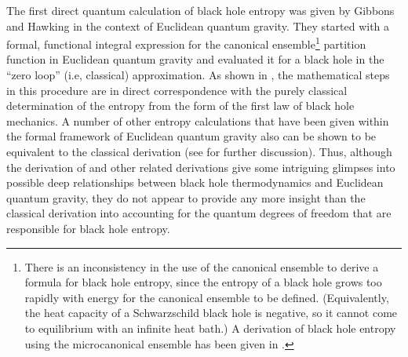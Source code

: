 \documentclass[12pt]{article}
\begin{document}
The first direct quantum calculation of black hole entropy was given
by Gibbons and Hawking \cite{gh} in the context of Euclidean quantum
gravity. They started with a formal, functional integral expression
for the canonical ensemble\footnote{There is an inconsistency in the
use of the canonical ensemble to derive a formula for black hole
entropy, since the entropy of a black hole grows too rapidly with
energy for the canonical ensemble to be defined. (Equivalently, the
heat capacity of a Schwarzschild black hole is negative, so it cannot
come to equilibrium with an infinite heat bath.) A derivation
of black hole entropy using the microcanonical ensemble has been given
in \cite{by2}.} partition function in Euclidean quantum gravity and
evaluated it for a black hole in the ``zero loop'' (i.e, classical)
approximation. As shown in \cite{w6}, the mathematical steps in this
procedure are in direct correspondence with the purely classical
determination of the entropy from the form of the first law of black
hole mechanics. A number of other entropy calculations that have been
given within the formal framework of Euclidean quantum gravity also
can be shown to be equivalent to the classical derivation (see
\cite{iw2} for further discussion). Thus, although the derivation of
\cite{gh} and other related derivations give some intriguing glimpses
into possible deep relationships between black hole thermodynamics and
Euclidean quantum gravity, they do not appear to provide any more
insight than the classical derivation into accounting for the quantum
degrees of freedom that are responsible for black hole entropy.
\end{document}
